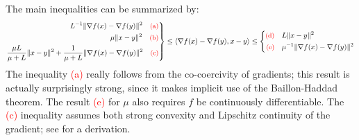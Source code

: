 \documentclass{article}
\newcommand{\<}{\langle}
\renewcommand{\>}{\rangle}
\begin{document}
The main inequalities can be summarized by: 
\begin{equation} \label{eq:big}
\left.\begin{aligned}
L^{-1} \| \nabla f(x) - \nabla f(y) \|^2  \quad\text{\small\textcolor{red}{(a)}} \\
\mu \|x-y\|^2 
\quad\text{\small\textcolor{red}{(b)}} \\
\frac{\mu L}{\mu + L} \|x-y\|^2  + \frac{1}{\mu+L}\| \nabla f(x) - \nabla f(y) \|^2
\quad\text{\small\textcolor{red}{(c)}}
\end{aligned} \right\rbrace
\le \< \nabla f(x) - \nabla f(y), x-y \> 
\le 
\left\lbrace\begin{aligned}
\text{\small\textcolor{red}{(d)}} \quad& L \|x-y\|^2  \\
\text{\small\textcolor{red}{(e)}} \quad& \mu^{-1}  \| \nabla f(x) - \nabla f(y) \|^2
\end{aligned} \right.
\end{equation}
The inequality {\small\textcolor{red}{(a)}} %
really follows from the co-coercivity of gradients; this result is actually surprisingly strong, since it makes implicit use of the Baillon-Haddad theorem. The result {\small\textcolor{red}{(e)}} for $\mu$ also requires $f$ be continuously differentiable. 
The {\small\textcolor{red}{(c)}} inequality 
assumes both strong convexity and Lipschitz continuity of the gradient; see \cite[Thm. 2.1.12]{Nesterov_2004} for a derivation.
\end{document}
